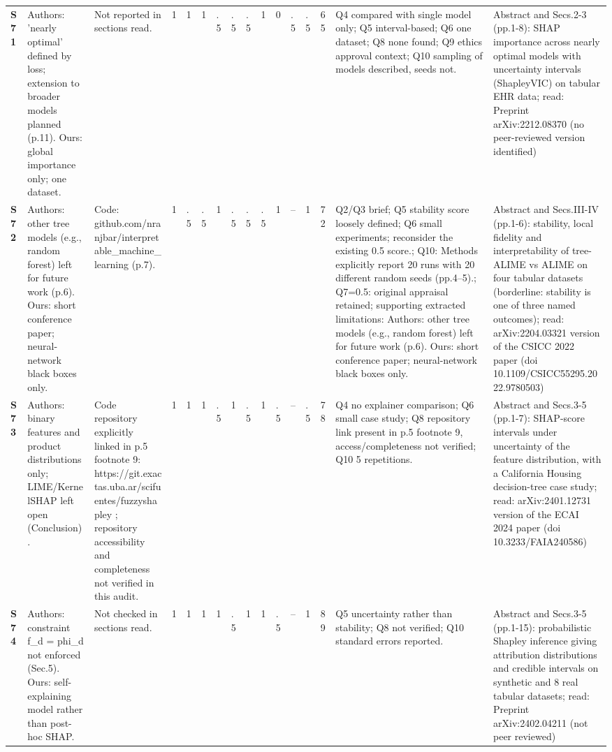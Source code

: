 \begin{longtable}{@{}P{1.0cm}P{4.6cm}P{3.6cm}P{0.3cm}P{0.3cm}P{0.3cm}P{0.3cm}P{0.3cm}P{0.3cm}P{0.3cm}P{0.3cm}P{0.3cm}P{0.36cm}P{0.75cm}P{3.0cm}P{3.9cm}@{}}
\textbf{S71} & Authors: 'nearly optimal' defined by loss; extension to broader models planned (p.11). Ours: global importance only; one dataset. & Not reported in sections read. & 1 & 1 & 1 & .5 & .5 & .5 & 1 & 0 & .5 & .5 & 65 & Q4 compared with single model only; Q5 interval-based; Q6 one dataset; Q8 none found; Q9 ethics approval context; Q10 sampling of models described, seeds not. & Abstract and Secs.2-3 (pp.1-8): SHAP importance across nearly optimal models with uncertainty intervals (ShapleyVIC) on tabular EHR data; read: Preprint arXiv:2212.08370 (no peer-reviewed version identified) \\
\textbf{S72} & Authors: other tree models (e.g., random forest) left for future work (p.6). Ours: short conference paper; neural-network black boxes only. & Code: github.com/\allowbreak{}nranjbar/\allowbreak{}interpretable\_\allowbreak{}machine\_\allowbreak{}learning (p.7). & 1 & .5 & .5 & 1 & .5 & .5 & .5 & 1 & -- & 1 & 72 & Q2/\allowbreak{}Q3 brief; Q5 stability score loosely defined; Q6 small experiments; reconsider the existing 0.5 score.; Q10: Methods explicitly report 20 runs with 20 different random seeds (pp.4--5).; Q7=0.5: original appraisal retained; supporting extracted limitations: Authors: other tree models (e.g., random forest) left for future work (p.6). Ours: short conference paper; neural-network black boxes only. & Abstract and Secs.III-IV (pp.1-6): stability, local fidelity and interpretability of tree-ALIME vs ALIME on four tabular datasets (borderline: stability is one of three named outcomes); read: arXiv:2204.03321 version of the CSICC 2022 paper (doi 10.1109/\allowbreak{}CSICC55295.2022.9780503) \\
\textbf{S73} & Authors: binary features and product distributions only; LIME/\allowbreak{}KernelSHAP left open (Conclusion). & Code repository explicitly linked in p.5 footnote 9: https:/\allowbreak{}/\allowbreak{}git.exactas.uba.ar/\allowbreak{}scifuentes/\allowbreak{}fuzzyshapley ; repository accessibility and completeness not verified in this audit. & 1 & 1 & 1 & .5 & 1 & .5 & 1 & .5 & -- & .5 & 78 & Q4 no explainer comparison; Q6 small case study; Q8 repository link present in p.5 footnote 9, access/\allowbreak{}completeness not verified; Q10 5 repetitions. & Abstract and Secs.3-5 (pp.1-7): SHAP-score intervals under uncertainty of the feature distribution, with a California Housing decision-tree case study; read: arXiv:2401.12731 version of the ECAI 2024 paper (doi 10.3233/\allowbreak{}FAIA240586) \\
\textbf{S74} & Authors: constraint f\_\allowbreak{}d = phi\_\allowbreak{}d not enforced (Sec.5). Ours: self-explaining model rather than post-hoc SHAP. & Not checked in sections read. & 1 & 1 & 1 & 1 & .5 & 1 & 1 & .5 & -- & 1 & 89 & Q5 uncertainty rather than stability; Q8 not verified; Q10 standard errors reported. & Abstract and Secs.3-5 (pp.1-15): probabilistic Shapley inference giving attribution distributions and credible intervals on synthetic and 8 real tabular datasets; read: Preprint arXiv:2402.04211 (not peer reviewed) \\

\end{longtable}

